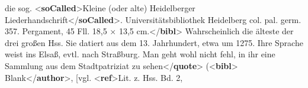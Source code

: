 \begin{shaded}
die sog. {<\textbf{soCalled}>}Kleine (oder alte)\mbox{}\newline 
\hspace*{1em}\hspace*{1em}\hspace*{1em}\hspace*{1em} Heidelberger Liederhandschrift{</\textbf{soCalled}>}.\mbox{}\newline 
{}Universitätsbibliothek Heidelberg col. pal.\mbox{}\newline 
\hspace*{1em}\hspace*{1em}\hspace*{1em}\hspace*{1em} germ. 357. Pergament, 45 Fll. 18,5 × 13,5 cm.{</\textbf{bibl}>}\mbox{}\newline 
\hspace*{1em}\hspace*{1em} Wahrscheinlich die älteste der drei großen Hss. Sie\mbox{}\newline 
{}datiert aus dem 13. Jahrhundert, etwa um 1275. Ihre Sprache\mbox{}\newline 
\hspace*{1em}\hspace*{1em}\hspace*{1em}\hspace*{1em} weist ins Elsaß, evtl. nach Straßburg. Man geht wohl nicht\mbox{}\newline 
\hspace*{1em}\hspace*{1em}\hspace*{1em}\hspace*{1em} fehl, in ihr eine Sammlung aus dem Stadtpatriziat zu sehen{</\textbf{quote}>}\mbox{}\newline 
\hspace*{1em}\hspace*{1em} ({<\textbf{bibl}>}\mbox{}\newline 
\hspace*{1em}\hspace*{1em}Blank{</\textbf{author}>}, [vgl. {<\textbf{ref}>}Lit. z. Hss. Bd. 2,\mbox{}\newline 

\end{shaded}
